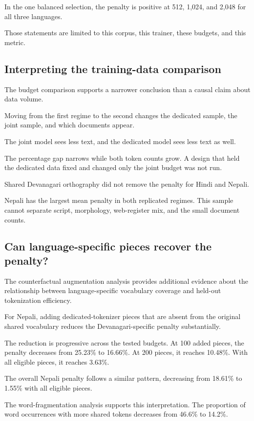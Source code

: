 \documentclass[10pt,twocolumn]{article}
\begin{document}
In the one balanced selection, the penalty is positive
at 512, 1,024, and 2,048 for all three languages.

Those statements are limited to this corpus, this trainer,
these budgets, and this metric.

\subsection{Interpreting the training-data comparison}

The budget comparison supports a narrower conclusion
than a causal claim about data volume.

Moving from the first regime to the second changes
the dedicated sample, the joint sample, and which
documents appear.

The joint model sees less text, and the dedicated model
sees less text as well.

The percentage gap narrows while both token counts grow.
A design that held the dedicated data fixed and changed
only the joint budget was not run.

Shared Devanagari orthography did not remove the penalty
for Hindi and Nepali.

Nepali has the largest mean penalty in both replicated
regimes. This sample cannot separate script, morphology,
web-register mix, and the small document counts.

\subsection{Can language-specific pieces recover the penalty?}

The counterfactual augmentation analysis provides
additional evidence about the relationship between
language-specific vocabulary coverage and held-out
tokenization efficiency.

For Nepali, adding dedicated-tokenizer pieces that are
absent from the original shared vocabulary reduces the
Devanagari-specific penalty substantially.

The reduction is progressive across the tested budgets.
At 100 added pieces, the penalty decreases from 25.23\%
to 16.66\%. At 200 pieces, it reaches 10.48\%.
With all eligible pieces, it reaches 3.63\%.

The overall Nepali penalty follows a similar pattern,
decreasing from 18.61\% to 1.55\% with all eligible
pieces.

The word-fragmentation analysis supports this interpretation.
The proportion of word occurrences with more shared
tokens decreases from 46.6\% to 14.2\%.
\end{document}
